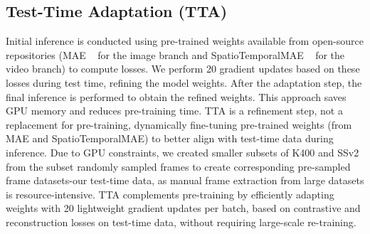 \subsection{Test-Time Adaptation (TTA)} 
Initial inference is conducted using pre-trained weights available from open-source repositories (MAE ~\cite{he2022masked} for the image branch and SpatioTemporalMAE ~\cite{feichtenhofer2022masked} for the video branch) to compute losses. We perform 20 gradient updates based on these losses during test time, refining the model weights. After the adaptation step, the final inference is performed to obtain the refined weights. This approach saves GPU memory and reduces pre-training time. TTA is a refinement step, not a replacement for pre-training, dynamically fine-tuning pre-trained weights (from MAE and SpatioTemporalMAE) to better align with test-time data during inference. Due to GPU constraints, we created smaller subsets of K400 and SSv2 from the subset randomly sampled frames to create corresponding pre-sampled frame datasets-our test-time data, as manual frame extraction from large datasets is resource-intensive. TTA complements pre-training by efficiently adapting weights with 20 lightweight gradient updates per batch, based on contrastive and reconstruction losses on test-time data, without requiring large-scale re-training. 


